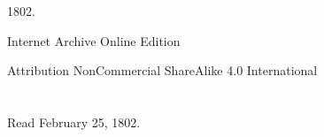 \documentclass[a4paper, 12pt, oneside, twocolumn]{article}
\begin{document}
\begin{titlepage}
	
		
	\vspace*{\fill}%
	
	1802.%
	
	\vspace{1\baselineskip} %

        Internet Archive Online Edition  %
	
	{\small Attribution NonCommercial ShareAlike 4.0 International } %
\end{titlepage}
\setlength{\parskip}{1mm plus1mm minus1mm}
\setcounter{tocdepth}{3}
\setcounter{secnumdepth}{3}
\section*{}
\begin{center}
Read February 25, 1802.
\end{center}
\end{document}
